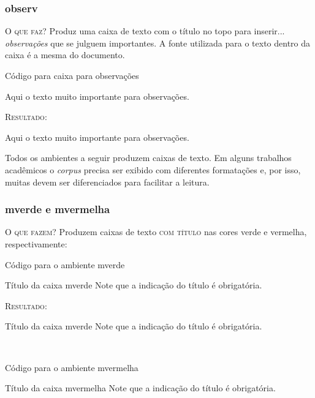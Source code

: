 \documentclass[a4paper,12pt,oneside,openright,extrafontsizes,openbib]{memoir}
\begin{document}
{\subsubsection{observ}

\textsc{O que faz?} Produz uma caixa de texto com o título  no topo para inserir... \textit{observações} que se julguem importantes. A fonte utilizada para o texto dentro da caixa é a mesma do documento.

\begin{codex}{Código para caixa para observações}
	\begin{observ}
	Aqui o texto muito importante para observações.
	\end{observ}
\end{codex}

\textsc{Resultado:}
\begin{observ}
	Aqui o texto muito importante para observações.
\end{observ}


Todos os ambientes a seguir produzem caixas de texto. Em alguns trabalhos acadêmicos o \textit{corpus} precisa ser exibido com diferentes formatações e, por isso, muitas devem ser diferenciados para facilitar a leitura. 

\subsubsection{mverde e mvermelha}

\textsc{O que fazem?} Produzem caixas de texto \textsc{com título} nas cores verde e vermelha, respectivamente:

\begin{codex}{Código para o ambiente mverde}
	\begin{mverde}{Título da caixa mverde}
	Note que a indicação do título é obrigatória.
	\end{mverde}
\end{codex}

\textsc{Resultado:}
\begin{mverde}{Título da caixa mverde}
	Note que a indicação do título é obrigatória.
\end{mverde}
\ \\

\begin{codex}{Código para o ambiente mvermelha}
	\begin{mvermelha}{Título da caixa mvermelha}
	Note que a indicação do título é obrigatória.
	\end{mvermelha}
\end{codex}

}
\end{document}
